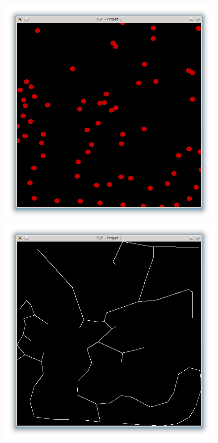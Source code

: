 \documentclass[a4paper,11pt]{article}
\begin{document}
\begin{center}
\begin{figure}[h]
\begin{center}
\includegraphics[scale=0.3]{cycleS.png}
\includegraphics[scale=0.3]{cycleT.png}

\end{center}
\end{figure}
\end{center}
\end{document}
